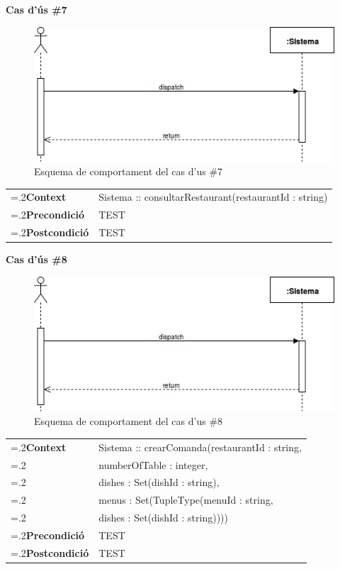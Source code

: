 \clearpage
\noindent\textbf{\large Cas d'ús \#7}\\
\begin{figure}[H]
\centering
\includegraphics[scale=0.6]{Figures/casdus_00.png}
\caption{Esquema de comportament del cas d'us \#7}
\end{figure}
\begin{table}[h]
\noindent
\begin{tabularx}{\linewidth}{
>{\hsize=.2\hsize}X%
>{\hsize=0.8\hsize}X%
}
\textbf{Context} 		& Sistema :: consultarRestaurant(restaurantId : string) \\
\textbf{Precondició} 	& TEST \\
\textbf{Postcondició}	& TEST \\
\end{tabularx}
\label{}
\end{table}

\noindent\textbf{\large Cas d'ús \#8}\\
\begin{figure}[H]
\centering
\includegraphics[scale=0.6]{Figures/casdus_00.png}
\caption{Esquema de comportament del cas d'us \#8}
\end{figure}
\begin{table}[h]
\noindent
\begin{tabularx}{\linewidth}{
>{\hsize=.2\hsize}X%
>{\hsize=0.8\hsize}X%
}
\textbf{Context} 		& Sistema :: crearComanda(restaurantId : string, \\
						& numberOfTable : integer, \\
						& dishes : Set(dishId : string), \\
						& menus : Set(TupleType(menuId : string, \\
						& dishes : Set(dishId : string)))) \\
\textbf{Precondició} 	& TEST \\
\textbf{Postcondició}	& TEST \\
\end{tabularx}
\label{}
\end{table}

